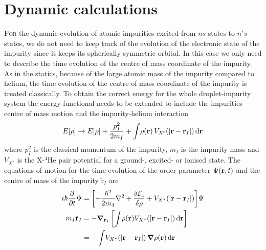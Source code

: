 \documentclass[12pt,a4paper,twosides]{book}
\renewcommand{\vec}[1]{\bm{\mathrm{#1}}}
\newcommand{\diff}[1]{\,\mathrm{d}{\vec{#1}}}
\begin{document}
	\section{Dynamic calculations}
		\lettrine[lines=3,findent=3pt,nindent=0pt]{F}{or} the dynamic evolution of atomic impurities excited from $ns$-states to $n's$-states, we do not need to keep track of the evolution of the electronic state of the impurity since it keeps its spherically symmetric orbital. In this case we only need to describe the time evolution of the centre of mass coordinate of the impurity. As in the statics, because of the large atomic mass of the impurity compared to helium, the time evolution of the centre of mass coordinate of the impurity is treated classically. To obtain the correct energy for the whole droplet-impurity system the energy functional needs to be extended to include the impurities centre of mass motion and the impurity-helium interaction
		\begin{align}
			E[\rho] \rightarrow E[\rho] + \frac{p^2_I}{2 m_I} + \int \! \rho(\mathbf{r}) \, V_{X^{\!*}}\qty(\abs{\vec{r}-\vec{r}_I})\diff{r} \label{eq33}
		\end{align}
		where $p^2_I$ is the classical momentum of the impurity, $m_I$ is the impurity mass and $V_{X^{\!*}}$ is the X-$^4$He pair potential for a ground-, excited- or ionised state. The equations of motion for the time evolution of the order parameter $\Psi\qty(\vec{r},t)$ and the centre of mass of the impurity $\ddot{\vec{r}}_I$ are  
		\begin{align}
			i\hbar\frac{\partial}{\partial t} \Psi &= \qty[-\frac{\hbar^2}{2m_4} \laplacian +\frac{\delta {\cal E}_c}{\delta \rho} + V_{X^*}(|\mathbf{r}- \mathbf{r}_I|)]\Psi\nonumber\\
			m_I \ddot{\mathbf{r}}_I &= - \grad_{\vec{r}_I} \left[  \int \!\rho(\mathbf{r}) V_{X^*}(|\mathbf{r}- \mathbf{r}_I|)\diff{r}  \right] \nonumber \\
			&= -\int \! V_{X^*}(|\mathbf{r}- \mathbf{r}_I|)  \, \grad \rho(\mathbf{r})\diff{r} \label{eq34}
		\end{align}
	
\end{document}
